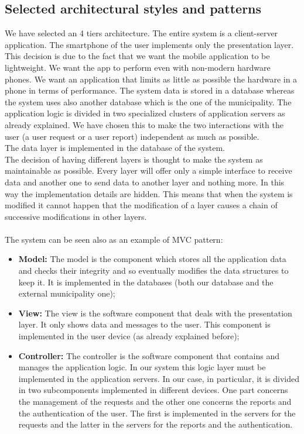 \documentclass[titlepage]{article}
\begin{document}
\subsection{Selected architectural styles and patterns}
We have selected an 4 tiers architecture. The entire system is a client-server application. The smartphone of the user implements only the presentation layer. This decision is due to the fact that we want the mobile application to be lightweight. We want the app to perform even with non-modern hardware phones. We want an application that limits as little as possible the hardware in a phone in terms of performance. The system data is stored in a database whereas the system uses also another database which is the one of the municipality.
The application logic is divided in two specialized clusters of application servers as already explained. We have chosen this to make the two interactions with the user (a user request or a user report) independent as much as possible.\\
 The data layer is implemented in the database of the system.\\
The decision of having different layers is thought to make the system as maintainable as possible. Every layer will offer only a simple interface to receive data and another one to send data to another layer and nothing more. In this way the implementation details are hidden. This means that when the system is modified it cannot happen that the modification of a layer causes a chain of successive modifications in other layers.\\ \\
The system can be seen also as an example of MVC pattern:
\begin{itemize}
	 \item \textbf{Model:} The model is the component which stores all the application data and checks their integrity and so eventually modifies the data structures to keep it. It is implemented in the databases (both our database and the external municipality one);
	 \item \textbf{View:} The view is the software component that deals with the presentation layer. It only shows data and messages to the user. This component is implemented in the user device (as already explained before);
	 \item \textbf{Controller:} The controller is the software component that contains and manages the application logic. In our system this logic layer must be implemented in the application servers.
In our case, in particular, it is divided in two subcomponents implemented in different devices. One part concerns the management of the requests and the other one concerns the reports and the authentication of the user. The first is implemented in the servers for the requests and the latter in the servers for the reports and the authentication.
\end{itemize}
\end{document}
